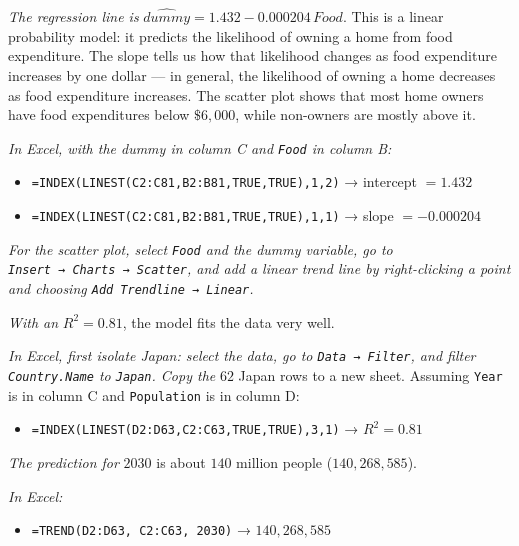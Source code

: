 \documentclass[
  11pt,
  letterpaper,
  DIV=11,
  numbers=noendperiod,
  oneside,
  open=any]{scrreprt}
\providecommand{\tightlist}{%
  \setlength{\itemsep}{0pt}\setlength{\parskip}{0pt}}\usepackage{longtable,booktabs,array}
\newenvironment{bsanswerkey}[2]{%
  \begin{tcolorbox}[bsbase, colback=bspaper2, colframe=bsline, fontupper=\small,
    title={\hypertarget{a-#1}{}\label{a-#1}\hyperlink{q-#1}{\textcolor{bsink2}{\MakeUppercase{#2}}}\hfill
      \hyperlink{q-#1}{\textcolor{bsaccent}{\normalfont\footnotesize back to page \pageref{q-#1}}}}]}%
  {\end{tcolorbox}}
\begin{document}
\begin{bsanswerkey}{bsans66}{Exercise 3, question 3}

\emph{The regression line is} \(\widehat{dummy}=1.432-0.000204\,Food\).
This is a linear probability model: it predicts the likelihood of owning
a home from food expenditure. The slope tells us how that likelihood
changes as food expenditure increases by one dollar --- in general, the
likelihood of owning a home decreases as food expenditure increases. The
scatter plot shows that most home owners have food expenditures below
\(\$6,000\), while non-owners are mostly above it.

\emph{In Excel, with the dummy in column C and \texttt{Food} in column
B:}

\begin{itemize}
\tightlist
\item
  \texttt{=INDEX(LINEST(C2:C81,B2:B81,TRUE,TRUE),1,2)} → intercept
  \(= 1.432\)
\item
  \texttt{=INDEX(LINEST(C2:C81,B2:B81,TRUE,TRUE),1,1)} → slope
  \(= -0.000204\)
\end{itemize}

\emph{For the scatter plot, select \texttt{Food} and the dummy variable,
go to \texttt{Insert\ →\ Charts\ →\ Scatter}, and add a linear trend
line by right-clicking a point and choosing
\texttt{Add\ Trendline\ →\ Linear}.}

\end{bsanswerkey}

\begin{bsanswerkey}{bsans67}{Exercise 4, question 1}

\emph{With an} \(R^2=0.81\), the model fits the data very well.

\emph{In Excel, first isolate Japan: select the data, go to
\texttt{Data\ →\ Filter}, and filter \texttt{Country.Name} to
\texttt{Japan}. Copy the} \(62\) Japan rows to a new sheet. Assuming
\texttt{Year} is in column C and \texttt{Population} is in column D:

\begin{itemize}
\tightlist
\item
  \texttt{=INDEX(LINEST(D2:D63,C2:C63,TRUE,TRUE),3,1)} → \(R^2 = 0.81\)
\end{itemize}

\end{bsanswerkey}

\begin{bsanswerkey}{bsans68}{Exercise 4, question 2}

\emph{The prediction for} \(2030\) is about \(140\) million people
(\(140{,}268{,}585\)).

\emph{In Excel:}

\begin{itemize}
\tightlist
\item
  \texttt{=TREND(D2:D63,\ C2:C63,\ 2030)} → \(140{,}268{,}585\)
\end{itemize}

\end{bsanswerkey}
\end{document}
